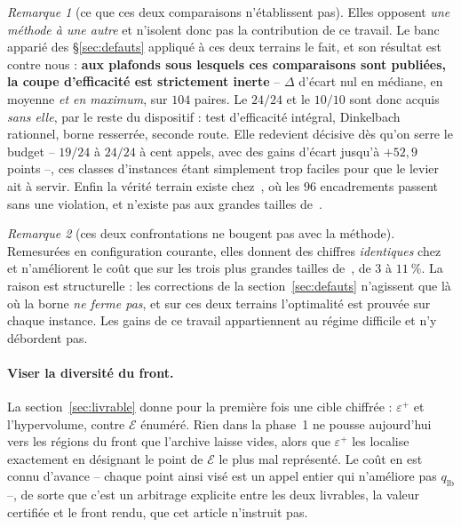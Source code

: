 \documentclass[11pt,a4paper]{article}
\theoremstyle{plain}
\theoremstyle{remark}
\newtheorem{remark}{Remarque}
\newcommand{\Ecal}{\mathcal{E}}
\begin{document}
\begin{remark}[ce que ces deux comparaisons n'établissent pas]
\label{rem:littinerte}
Elles opposent \emph{une méthode à une autre} et n'isolent donc pas la
contribution de ce travail. Le banc apparié des §\ref{sec:defauts} appliqué
à ces deux terrains le fait, et son résultat est contre nous : \textbf{aux
plafonds sous lesquels ces comparaisons sont publiées, la coupe
d'efficacité est strictement inerte} -- $\Delta$ d'écart nul en médiane, en
moyenne \emph{et en maximum}, sur $104$ paires. Le $24/24$ et le $10/10$
sont donc acquis \emph{sans elle}, par le reste du dispositif : test
d'efficacité intégral, Dinkelbach rationnel, borne resserrée, seconde route.
Elle redevient décisive dès qu'on serre le budget -- $19/24$ à $24/24$ à
cent appels, avec des gains d'écart jusqu'à $+52{,}9$ points --, ces classes
d'instances étant simplement trop faciles pour que le levier ait à servir.
Enfin la vérité terrain existe chez~\cite{zerdani2011}, où les $96$
encadrements passent sans une violation, et n'existe pas aux grandes tailles
de~\cite{drici2018}.
\end{remark}

\begin{remark}[ces deux confrontations ne bougent pas avec la méthode]
Remesurées en configuration courante, elles donnent des chiffres
\emph{identiques} chez~\cite{zerdani2011} et n'améliorent le coût que sur
les trois plus grandes tailles de~\cite{drici2018}, de $3$ à $11\ \%$. La
raison est structurelle : les corrections de la section~\ref{sec:defauts}
n'agissent que là où la borne \emph{ne ferme pas}, et sur ces deux terrains
l'optimalité est prouvée sur chaque instance. Les gains de ce travail
appartiennent au régime difficile et n'y débordent pas.
\end{remark}

\paragraph{Viser la diversité du front.} La section~\ref{sec:livrable} donne
pour la première fois une cible chiffrée : $\varepsilon^+$ et l'hypervolume,
contre $\Ecal$ énuméré. Rien dans la phase~1 ne pousse aujourd'hui vers les
régions du front que l'archive laisse vides, alors que $\varepsilon^+$ les
localise exactement en désignant le point de $\Ecal$ le plus mal représenté.
Le coût en est connu d'avance -- chaque point ainsi visé est un appel entier
qui n'améliore pas $q_{\text{lb}}$ --, de sorte que c'est un arbitrage
explicite entre les deux livrables, la valeur certifiée et le front rendu,
que cet article n'instruit pas.
\end{document}
